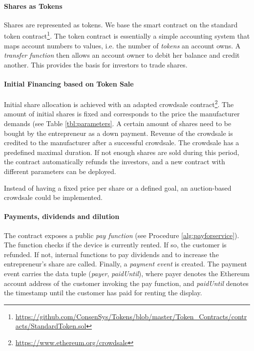 \paragraph{Shares as Tokens}

Shares are represented as tokens. We base the smart contract on the standard token contract\footnote{\url{https://github.com/ConsenSys/Tokens/blob/master/Token\_Contracts/contracts/StandardToken.sol}}. The token contract is essentially a simple accounting system that maps account numbers to values, i.e. the number of \emph{tokens} an account owns. A \emph{transfer function} then allows an account owner to debit her balance and credit another. This provides the basis for investors to trade shares. 

\paragraph{Initial Financing based on Token Sale}

Initial share allocation is achieved with an adapted crowdsale contract\footnote{\url{https://www.ethereum.org/crowdsale}}. The amount of initial shares is fixed and corresponds to the price the manufacturer demands (see Table \ref{tbl:parameters}. A certain amount of shares need to be bought by the entrepreneur as a down payment. Revenue of the crowdsale is credited to the manufacturer after a successful crowdsale. The crowdsale has a predefined maximal duration. If not enough shares are sold during this period, the contract automatically refunds the investors, and a new contract with different parameters can be deployed.

Instead of having a fixed price per share or a defined goal, an auction-based crowdsale could be implemented.

\paragraph{Payments, dividends and dilution}

The contract exposes a public \emph{pay function} (see Procedure \ref{alg:payforservice}). The function checks if the device is currently rented. If so, the customer is refunded. If not, internal functions to pay dividends and to increase the entrepreneur's share are called. Finally, a \emph{payment event} is created. The payment event carries the data tuple (\emph{payer}, \emph{paidUntil}), where payer denotes the Ethereum account address of the customer invoking the pay function, and \emph{paidUntil} denotes the timestamp until the customer has paid for renting the display. 

